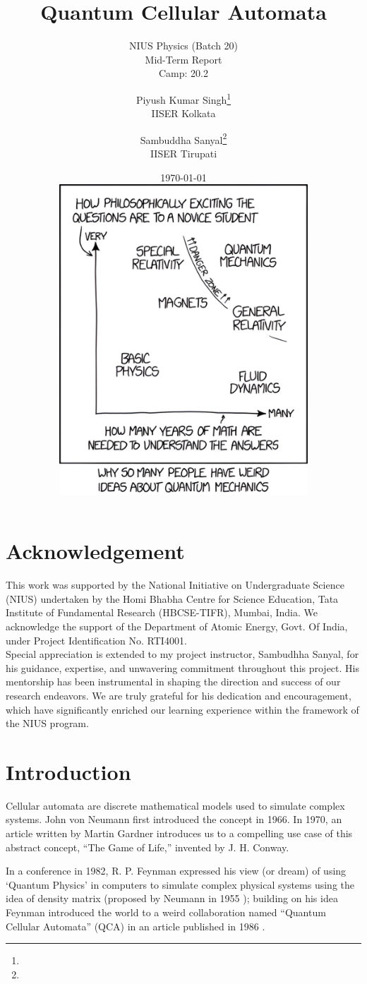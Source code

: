 \documentclass[11pt, oneside, listof=totoc]{scrbook}
\title{Quantum Cellular Automata}
\subtitle{NIUS Physics (Batch 20) \\ Mid-Term Report \\ Camp: 20.2}
\author{
    Piyush Kumar Singh\thanks{\mailto{pks22ms027@iiserkol.ac.in}} \\ {\large IISER Kolkata} 
    \and
    Sambuddha Sanyal\thanks{\mailto{sambuddha.sanyal@iisertirupati.ac.in}} \\ {\large IISER Tirupati}
}
\date{
    \today \\[3ex]
    \includegraphics[width = 0.7\textwidth]{quantum-xkcd-better.png}
}
\begin{document}
\frontmatter
\begin{titlepage}
    \let\newpage\relax%
    \singhtitle
\end{titlepage}

\chapter*{Acknowledgement}

{\large\noindent
    This work was supported by the National Initiative on Undergraduate Science (NIUS) undertaken
    by the Homi Bhabha Centre for Science Education, Tata Institute of Fundamental Research
    (HBCSE-TIFR), Mumbai, India. We acknowledge the support of the Department of Atomic
    Energy, Govt. Of India, under Project Identification No. RTI4001.\\

    Special appreciation is extended to my project instructor, Sambudhha Sanyal, for his guidance, expertise, and unwavering commitment throughout this project. His mentorship has been instrumental in shaping the direction and success of our research endeavors. We are truly grateful for his dedication and encouragement, which have significantly enriched our learning experience within the framework of the NIUS program.
}

\tableofcontents
\lstlistoflistings

\mainmatter

\chapter{Introduction}


Cellular automata are discrete mathematical models used to simulate complex systems. John von Neumann first introduced the concept \cite{Neumann1966} in 1966. In 1970, an article written by Martin Gardner \cite{Gardner1970} introduces us to a compelling use case of this abstract concept, ``The Game of Life,'' invented by J. H. Conway.


In a conference in 1982, R. P. Feynman expressed his view (or dream) of using `Quantum Physics' in computers \cite{Feynman1982} to simulate complex physical systems using the idea of density matrix (proposed by Neumann in 1955 \cite{Neumann2018}); building on his idea Feynman introduced the world to a weird collaboration named ``Quantum Cellular Automata'' (QCA) in an article published in 1986 \cite{Feynman1986}.
\end{document}
